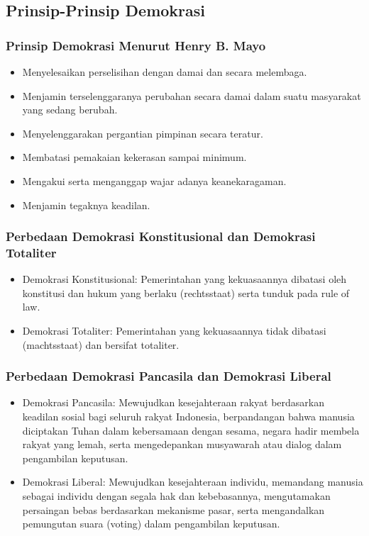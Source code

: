 \subsection{Prinsip-Prinsip Demokrasi}

\subsubsection{Prinsip Demokrasi Menurut Henry B. Mayo}
\begin{itemize}
\item Menyelesaikan perselisihan dengan damai dan secara melembaga.
\item Menjamin terselenggaranya perubahan secara damai dalam suatu masyarakat yang sedang berubah.
\item Menyelenggarakan pergantian pimpinan secara teratur.
\item Membatasi pemakaian kekerasan sampai minimum.
\item Mengakui serta menganggap wajar adanya keanekaragaman.
\item Menjamin tegaknya keadilan.
\end{itemize}

\subsubsection{Perbedaan Demokrasi Konstitusional dan Demokrasi Totaliter}
\begin{itemize}
\item Demokrasi Konstitusional: Pemerintahan yang kekuasaannya dibatasi oleh konstitusi dan hukum yang berlaku (rechtsstaat) serta tunduk pada rule of law.
\item Demokrasi Totaliter: Pemerintahan yang kekuasaannya tidak dibatasi (machtsstaat) dan bersifat totaliter.
\end{itemize}

\subsubsection{Perbedaan Demokrasi Pancasila dan Demokrasi Liberal}
\begin{itemize}
\item Demokrasi Pancasila: Mewujudkan kesejahteraan rakyat berdasarkan keadilan sosial bagi seluruh rakyat Indonesia, berpandangan bahwa manusia diciptakan Tuhan dalam kebersamaan dengan sesama, negara hadir membela rakyat yang lemah, serta mengedepankan musyawarah atau dialog dalam pengambilan keputusan.
\item Demokrasi Liberal: Mewujudkan kesejahteraan individu, memandang manusia sebagai individu dengan segala hak dan kebebasannya, mengutamakan persaingan bebas berdasarkan mekanisme pasar, serta mengandalkan pemungutan suara (voting) dalam pengambilan keputusan.
\end{itemize}

